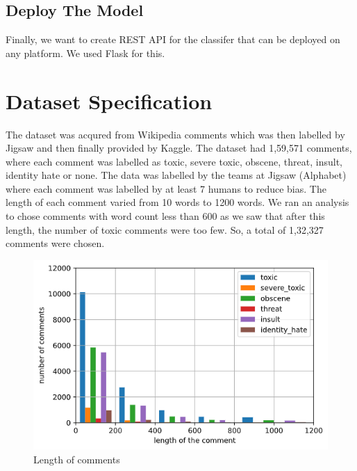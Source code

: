 \documentclass[11pt]{article}
\begin{document}
\subsection*{Deploy The Model}
Finally, we want to create REST API for the classifer that can be deployed on any platform. We used Flask for this.	


\section{Dataset Specification}
The dataset was acqured from Wikipedia comments which was then labelled by Jigsaw and then finally provided by Kaggle. The dataset had 1,59,571 comments, where each comment was labelled as toxic, severe toxic, obscene, threat, insult, identity hate or none. 
The data was labelled by the teams at Jigsaw (Alphabet) where each comment was labelled by at least 7 humans to reduce bias.
The length of each comment varied from 10 words to 1200 words. 
We ran an analysis to chose comments with
word count less than 600 as we saw that after this length, the number of toxic 
comments were too few. So, a total of 1,32,327 comments were chosen.
\begin{figure}[h]
\begin{center}
	\includegraphics[scale=0.5]{figs/distribution.png}
	\caption{Length of comments}
	\label{fig:data_distribution}
\end{center}
\end{figure}
\end{document}
